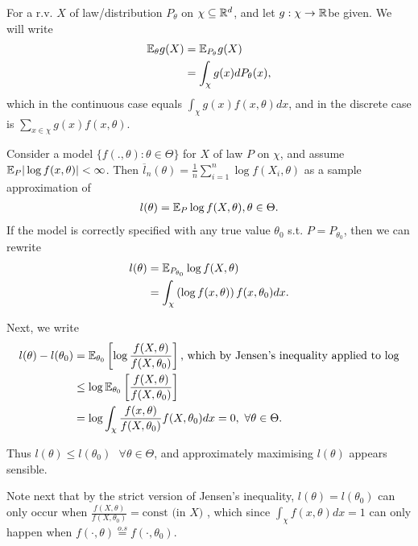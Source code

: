 \documentclass[a4paper]{article}
\begin{document}
For a r.v. $X$ of law/distribution $P_{\theta}$ on $\chi \subseteq \mathbb{R}^{d}$, and let $g: \chi \to  \mathbb{R}$be given. We will write
\begin{align*}
	\mathbb{E}_{\theta} g(X) &= \mathbb{E}_{P_{\theta}} g(X) \\
	&= \int_{\chi} g(x) dP_{\theta}(x)
,\end{align*}
which in the continuous case equals $\int_{\chi} g(x) f(x, \theta) dx$, and in the discrete case is $\sum_{x \in \chi}g(x) f(x, \theta)$.

\begin{observation}[1]
	Consider a model $\{f(., \theta) : \theta \in \Theta\}$ for $X$ of law $P$ on $\chi$, and assume $\mathbb{E}_{P} |\log f(x, \theta)| < \infty$. Then $\overline{l}_{n}(\theta) = \frac{1}{n}\sum_{i=1}^{n}\log f(X_{i}, \theta)$ as a sample approximation of
	\begin{align*}
		l(\theta) = \mathbb{E}_{P} \log f(X, \theta), \theta \in \Theta
	.\end{align*}
	If the model is correctly specified with any true value $\theta_{0}$ s.t. $P=P_{\theta_{0}}$, then we can rewrite
	\begin{align*}
		l(\theta) &= \mathbb{E}_{P_{\theta_{0}}} \log f(X, \theta) \\
		&= \int_{\chi} \left(\log f(x, \theta) \right) f(x, \theta_{0}) dx
	.\end{align*}

	Next, we write 
	\begin{align*}
		l(\theta) - l(\theta_{0}) &= \mathbb{E}_{\theta_{0}}\left[ \log \frac{f(X, \theta)}{f(X, \theta_{0})} \right] \text{, which by Jensen's inequality applied to log} \\
		&\le \log \mathbb{E}_{\theta_{0}}\left[ \frac{f(X, \theta)}{f(X, \theta_{0})} \right] \\
		&= \log \int_{\chi} \frac{f(x, \theta)}{f(X, \theta_{0})} f(X, \theta_{0}) dx = 0,\text{ } \forall \theta \in  \Theta
	.\end{align*}

	Thus $l(\theta) \le l(\theta_{0}) \text{ }\forall \theta \in \Theta$, and approximately maximising $l(\theta)$ appears sensible.

	Note next that by the strict version of Jensen's inequality,  $l(\theta) = l(\theta_{0})$ can only occur when $\frac{f(X, \theta)}{f(X, \theta_{0})} = \text{const (in $X$) }$, which since $\int_{\chi} f(x, \theta) dx = 1$ can only happen when $f(\cdot , \theta) \stackrel{o.s}{=} f(\cdot , \theta_{0})$.
\end{observation}
\end{document}
